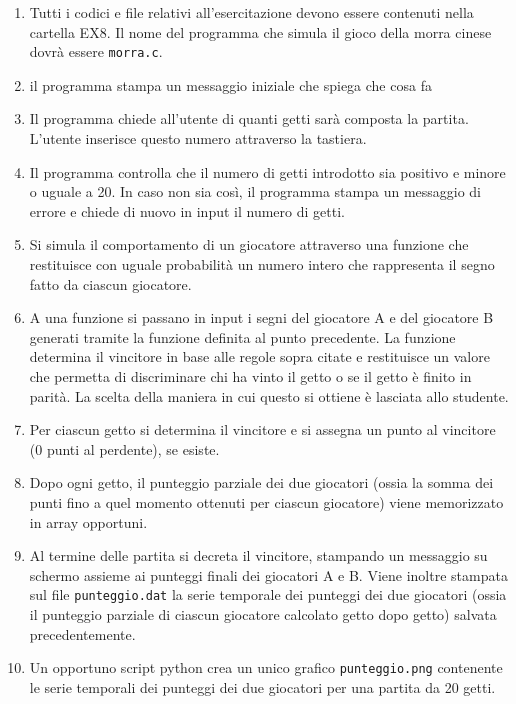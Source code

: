 \documentclass[11pt]{article}
\begin{document}
\begin{enumerate}
\item Tutti i codici e file relativi all'esercitazione devono essere contenuti nella cartella EX8. Il nome del programma che simula il gioco della morra cinese dovr\`{a} essere \texttt{morra.c}.
\item il programma stampa un messaggio iniziale che spiega che cosa fa
\item Il programma chiede all'utente di quanti getti sar\`a composta la partita.
L'utente inserisce questo numero attraverso la tastiera.
\item Il programma controlla che il numero di getti introdotto sia positivo e minore o uguale a 20. In caso non sia cos\`{i}, il programma stampa un messaggio di errore e chiede di nuovo in input il numero di getti.
\item Si simula il comportamento di un giocatore attraverso una funzione che
restituisce con uguale probabilit\`a un numero intero che rappresenta il segno
fatto da ciascun giocatore.
\item  A una funzione si passano in input i segni del giocatore A e del giocatore B generati tramite la funzione definita al punto precedente. La
funzione determina il vincitore in base alle regole sopra citate e restituisce
un valore che permetta di discriminare chi ha vinto il getto o se il getto \`e finito in parit\`a. La scelta della maniera in cui questo si ottiene \`e lasciata
allo studente. 
\item Per ciascun getto si determina il vincitore e si assegna un punto al vincitore (0 punti al perdente), se esiste.
\item Dopo ogni getto, il punteggio parziale dei due giocatori (ossia la somma dei punti fino a quel momento ottenuti per ciascun giocatore)  viene memorizzato in array opportuni.
\item Al termine delle partita si decreta il vincitore, stampando un messaggio su schermo assieme ai punteggi finali  dei giocatori A e B. Viene inoltre stampata sul file \texttt{punteggio.dat} la serie temporale dei punteggi dei due giocatori (ossia il punteggio parziale di ciascun giocatore calcolato getto dopo getto) salvata precedentemente.
\item Un opportuno script python crea un unico grafico \texttt{punteggio.png} contenente le serie temporali dei punteggi dei due giocatori per una partita da 20 getti.

\end{enumerate}
\end{document}
